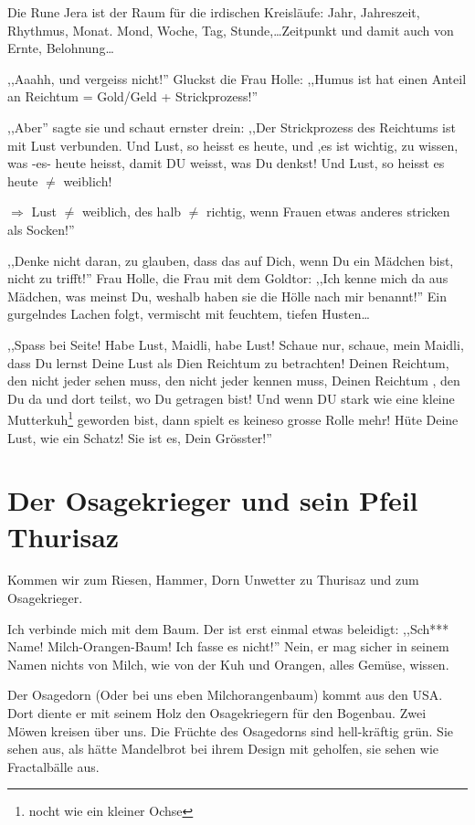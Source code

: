 \documentclass[11pt,titlepage,a5paper]{book}
\begin{document}
Die Rune Jera  ist der Raum für die irdischen Kreisläufe: Jahr, Jahreszeit, Rhythmus, Monat. Mond, Woche, Tag, Stunde,\dots Zeitpunkt und damit auch von Ernte, Belohnung\dots

,,Aaahh, und vergeiss nicht!'' Gluckst die Frau Holle: ,,Humus ist hat einen Anteil an Reichtum = Gold/Geld + Strickprozess!''

,,Aber'' sagte sie und schaut ernster drein: ,,Der Strickprozess des Reichtums ist mit Lust verbunden. Und Lust, so heisst es heute, und ,es ist wichtig, zu wissen, was -es- heute heisst, damit DU weisst, was Du denkst! Und Lust, so heisst es heute $\neq$ weiblich!

$\Rightarrow$ Lust $\neq$ weiblich, des halb $\neq$ richtig, wenn Frauen etwas anderes stricken als Socken!''

,,Denke nicht daran, zu glauben, dass das auf Dich, wenn Du ein Mädchen bist, nicht zu trifft!'' Frau Holle, die Frau mit dem Goldtor: ,,Ich kenne mich da aus Mädchen, was meinst Du, weshalb haben sie die Hölle nach mir benannt!'' Ein gurgelndes Lachen folgt, vermischt mit feuchtem, tiefen Husten\dots

,,Spass bei Seite! Habe Lust, Maidli, habe Lust! Schaue nur, schaue, mein Maidli, dass Du lernst Deine Lust als Dien Reichtum zu betrachten! Deinen Reichtum, den nicht jeder sehen muss, den nicht jeder kennen muss, Deinen Reichtum , den Du da und dort teilst, wo Du getragen bist! Und wenn DU stark wie eine kleine Mutterkuh\footnote{nocht wie ein kleiner Ochse} geworden bist, dann spielt es keineso grosse Rolle mehr! Hüte Deine Lust, wie ein Schatz! Sie ist es, Dein Grösster!''


\section{Der Osagekrieger und sein Pfeil Thurisaz \textarc{[\withlines]\th} }

Kommen wir zum Riesen, Hammer, Dorn Unwetter zu Thurisaz \textarc{[\withlines]\th} und zum Osagekrieger. 

Ich verbinde mich mit dem Baum. Der ist erst einmal etwas beleidigt: ,,Sch*** Name! Milch-Orangen-Baum! Ich fasse es nicht!'' Nein, er mag sicher in seinem Namen nichts von Milch, wie von der Kuh und Orangen, alles Gemüse, wissen.

Der Osagedorn (Oder bei uns eben Milchorangenbaum) kommt aus den USA. Dort diente er mit seinem Holz den Osagekriegern für den Bogenbau. Zwei Möwen kreisen über uns. Die Früchte des Osagedorns sind hell-kräftig grün. Sie sehen aus, als hätte Mandelbrot bei ihrem Design mit geholfen, sie sehen wie Fractalbälle aus. 
\end{document}
